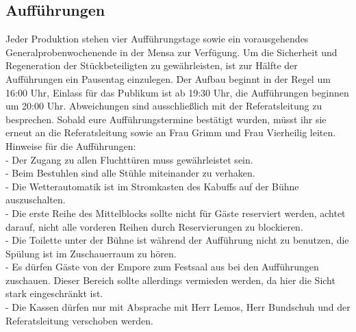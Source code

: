 \subsection{Aufführungen}
Jeder Produktion stehen vier Aufführungstage sowie ein vorausgehendes Generalprobenwochenende in der Mensa zur Verfügung. 	
Um die Sicherheit und Regeneration der Stückbeteiligten zu gewährleisten, ist zur Hälfte der Aufführungen ein Pausentag einzulegen. 
Der Aufbau beginnt in der Regel um 16:00 Uhr, Einlass für das Publikum ist ab 19:30 Uhr, die Aufführungen beginnen um 20:00 Uhr.
Abweichungen sind ausschließlich mit der Referatsleitung zu besprechen.
Sobald eure Aufführungstermine bestätigt wurden, müsst ihr sie erneut an die Referatsleitung sowie an Frau Grimm und Frau Vierheilig leiten.
Hinweise für die Aufführungen:	\\
-	Der Zugang zu allen Fluchttüren muss gewährleistet sein. \\
-	Beim Bestuhlen sind alle Stühle miteinander zu verhaken.\\
-	Die Wetterautomatik ist im Stromkasten des Kabuffs auf der Bühne auszuschalten.\\
-	Die erste Reihe des Mittelblocks sollte nicht für Gäste reserviert werden, achtet darauf, nicht alle vorderen Reihen durch Reservierungen zu blockieren.\\
-	Die Toilette unter der Bühne ist während der Aufführung nicht zu benutzen, die Spülung ist im Zuschauerraum zu hören.\\
-	Es dürfen Gäste von der Empore zum Festsaal aus bei den Aufführungen zuschauen. Dieser Bereich sollte allerdings vermieden werden, da hier die Sicht stark eingeschränkt ist.\\
-	Die Kassen dürfen nur mit Absprache mit Herr Lemos, Herr Bundschuh und der Referatsleitung verschoben werden.
